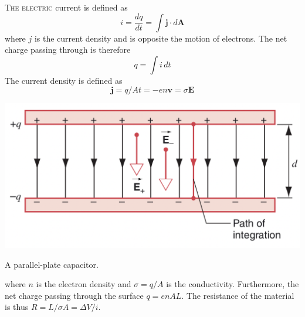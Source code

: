 \documentclass{tufte-book}
\renewcommand{\b}{\mathbf}
\begin{document}
\textsc{The electric} current is defined as \begin{equation}
  i = \frac{dq}{dt} = \int \b j \cdot d \b A
\end{equation} where $j$ is the current density and is opposite the motion of electrons. The net charge passing through is therefore \begin{equation}
  q = \int i \, dt
\end{equation}
The current density is defined as \begin{equation}
  \b j = q/At = - en \b v = \sigma \b E
\end{equation}
\begin{marginfigure}
  \includegraphics[width=1\textwidth]{ppc}
  \caption{A parallel-plate capacitor.}
\end{marginfigure}
where $n$ is the electron density and $\sigma = q/A$ is the conductivity. Furthermore, the net charge passing through the surface $q = enAL$. The resistance of the material is thus $R = L/\sigma A = \Delta V / i$.
\end{document}
